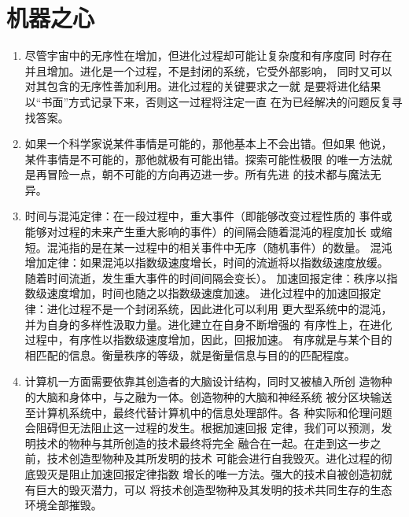 \documentclass[UTF8]{ctexart}
\begin{document}
	\newpage
	
	\section{机器之心}
	
	
		\begin{enumerate}
			\item 尽管宇宙中的无序性在增加，但进化过程却可能让复杂度和有序度同
			时存在并且增加。进化是一个过程，不是封闭的系统，它受外部影响，
			同时又可以对其包含的无序性善加利用。进化过程的关键要求之一就
			是要将进化结果以“书面”方式记录下来，否则这一过程将注定一直
			在为已经解决的问题反复寻找答案。
			
			\item 如果一个科学家说某件事情是可能的，那他基本上不会出错。但如果
			他说，某件事情是不可能的，那他就极有可能出错。探索可能性极限
			的唯一方法就是再冒险一点，朝不可能的方向再迈进一步。所有先进
			的技术都与魔法无异。
			
			
			\item	时间与混沌定律：在一段过程中，重大事件（即能够改变过程性质的
			事件或能够对过程的未来产生重大影响的事件）的间隔会随着混沌的程度加长
			或缩短。混沌指的是在某一过程中的相关事件中无序（随机事件）的数量。
			混沌增加定律：如果混沌以指数级速度增长，时间的流逝将以指数级速度放缓。
			随着时间流逝，发生重大事件的时间间隔会变长）。
			加速回报定律：秩序以指数级速度增加，时间也随之以指数级速度加速。
			进化过程中的加速回报定律：进化过程不是一个封闭系统，因此进化可以利用
			更大型系统中的混沌，并为自身的多样性汲取力量。进化建立在自身不断增强的
			有序性上，在进化过程中，有序性以指数级速度增加，因此，回报加速。
			有序就是与某个目的相匹配的信息。衡量秩序的等级，就是衡量信息与目的的匹配程度。
			
			\item 计算机一方面需要依靠其创造者的大脑设计结构，同时又被植入所创
			造物种的大脑和身体中，与之融为一体。创造物种的大脑和神经系统
			被分区块输送至计算机系统中，最终代替计算机中的信息处理部件。各
			种实际和伦理问题会阻碍但无法阻止这一过程的发生。根据加速回报
			定律，我们可以预测，发明技术的物种与其所创造的技术最终将完全
			融合在一起。在走到这一步之前，技术创造型物种及其所发明的技术
			可能会进行自我毁灭。进化过程的彻底毁灭是阻止加速回报定律指数
			增长的唯一方法。强大的技术自被创造初就有巨大的毁灭潜力，可以
			将技术创造型物种及其发明的技术共同生存的生态环境全部摧毁。
			
		\end{enumerate}
	
\end{document}
